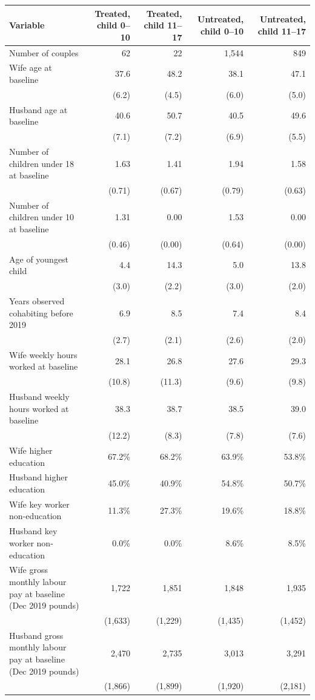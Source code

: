 
\begin{tabular}{lrrrr}
\toprule
Variable & Treated, child 0--10 & Treated, child 11--17 & Untreated, child 0--10 & Untreated, child 11--17\\
\midrule
Number of couples & 62 & 22 & 1,544 & 849\\
Wife age at baseline & 37.6 & 48.2 & 38.1 & 47.1\\
 & (6.2) & (4.5) & (6.0) & (5.0)\\
Husband age at baseline & 40.6 & 50.7 & 40.5 & 49.6\\
 & (7.1) & (7.2) & (6.9) & (5.5)\\
Number of children under 18 at baseline & 1.63 & 1.41 & 1.94 & 1.58\\
 & (0.71) & (0.67) & (0.79) & (0.63)\\
Number of children under 10 at baseline & 1.31 & 0.00 & 1.53 & 0.00\\
 & (0.46) & (0.00) & (0.64) & (0.00)\\
Age of youngest child & 4.4 & 14.3 & 5.0 & 13.8\\
 & (3.0) & (2.2) & (3.0) & (2.0)\\
Years observed cohabiting before 2019 & 6.9 & 8.5 & 7.4 & 8.4\\
 & (2.7) & (2.1) & (2.6) & (2.0)\\
Wife weekly hours worked at baseline & 28.1 & 26.8 & 27.6 & 29.3\\
 & (10.8) & (11.3) & (9.6) & (9.8)\\
Husband weekly hours worked at baseline & 38.3 & 38.7 & 38.5 & 39.0\\
 & (12.2) & (8.3) & (7.8) & (7.6)\\
Wife higher education & 67.2\% & 68.2\% & 63.9\% & 53.8\%\\
Husband higher education & 45.0\% & 40.9\% & 54.8\% & 50.7\%\\
Wife key worker non-education & 11.3\% & 27.3\% & 19.6\% & 18.8\%\\
Husband key worker non-education & 0.0\% & 0.0\% & 8.6\% & 8.5\%\\
Wife gross monthly labour pay at baseline (Dec 2019 pounds) & 1,722 & 1,851 & 1,848 & 1,935\\
 & (1,633) & (1,229) & (1,435) & (1,452)\\
Husband gross monthly labour pay at baseline (Dec 2019 pounds) & 2,470 & 2,735 & 3,013 & 3,291\\
 & (1,866) & (1,899) & (1,920) & (2,181)\\
\bottomrule
\end{tabular}
